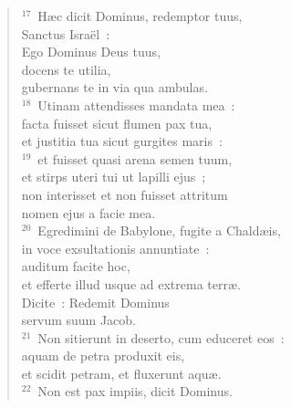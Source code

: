\begin{verse}
${}^{17}$~H\ae c dicit Dominus, redemptor tuus,\\ Sanctus Isra\"el~:\\ Ego Dominus Deus tuus,\\ docens te utilia,\\ gubernans te in via qua ambulas.\\
${}^{18}$~Utinam attendisses mandata mea~:\\ facta fuisset sicut flumen pax tua,\\ et justitia tua sicut gurgites maris~:\\
${}^{19}$~et fuisset quasi arena semen tuum,\\ et stirps uteri tui ut lapilli ejus~;\\ non interisset et non fuisset attritum\\ nomen ejus a facie mea.\\
${}^{20}$~Egredimini de Babylone, fugite a Chald\ae is,\\ in voce exsultationis annuntiate~:\\ auditum facite hoc,\\ et efferte illud usque ad extrema terr\ae .\\ Dicite~: Redemit Dominus\\ servum suum Jacob.\\
${}^{21}$~Non sitierunt in deserto, cum educeret eos~:\\ aquam de petra produxit eis,\\ et scidit petram, et fluxerunt aqu\ae .\\
${}^{22}$~Non est pax impiis, dicit Dominus.\end{verse}


